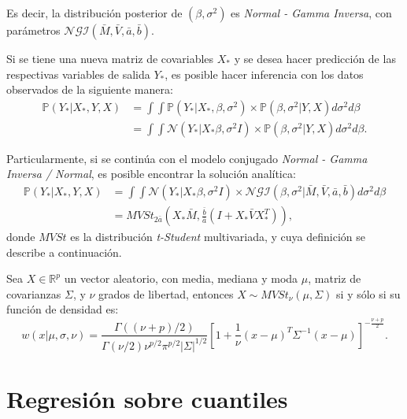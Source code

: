 Es decir, la distribuci\'on posterior de $(\beta,\sigma^2)$ es \textit{Normal - Gamma Inversa}, con par\'ametros $\mathcal{NGI}(\bar{M},\bar{V},\bar{a},\bar{b})$.

Si se tiene una nueva matriz de covariables $X_*$ y se desea hacer predicci\'on de las respectivas variables de salida $Y_*$, es posible hacer inferencia con los datos observados de la siguiente manera:
\begin{equation*}
\begin{aligned}
    \mathbb{P}(Y_*|X_*,Y,X)
    &= \int \int \mathbb{P}(Y_*|X_*,\beta,\sigma^2) \times \mathbb{P}(\beta,\sigma^2|Y,X) d\sigma^2 d\beta \\
    &= \int \int \mathcal{N}(Y_*|X_*\beta,\sigma^2I) \times \mathbb{P}(\beta,\sigma^2|Y,X) d\sigma^2 d\beta.
\end{aligned}
\end{equation*}

Particularmente, si se contin\'ua con el modelo conjugado \textit{Normal - Gamma Inversa / Normal}, es posible encontrar la soluci\'on anal\'itica:
\begin{equation*}
\begin{aligned}
    \mathbb{P}(Y_*|X_*,Y,X)
    &= \int \int \mathcal{N}(Y_*|X_*\beta,\sigma^2I) \times \mathcal{NGI}(\beta,\sigma^2|\bar{M},\bar{V},\bar{a},\bar{b}) d\sigma^2 d\beta \\
    &= MVSt_{2\bar{a}} 
       \left(
        X_*\bar{M},\frac{\bar{b}}{\bar{a}}\left(I + X_*\bar{V}X_*^T\right)
       \right),
\end{aligned}
\end{equation*}
donde $MVSt$ es la distribuci\'on \textit{t-Student} multivariada, y cuya definici\'on se describe a continuaci\'on. 

\begin{defin*}
    Sea $X \in \mathbb{R}^p$ un vector aleatorio, con media, mediana y moda $\mu$, matriz de covarianzas $\Sigma $, y $\nu$ grados de libertad, entonces $X \sim MVSt_{\nu}(\mu,\Sigma)$ si y s\'olo si su funci\'on de densidad es:
\begin{equation*}
    w(x|\mu,\sigma,\nu) = 
    \frac{\Gamma((\nu+p)/2)}{\Gamma(\nu/2)\nu^{p/2}\pi^{p/2}|\Sigma|^{1/2}}
    \left[1 + \frac{1}{\nu} (x-\mu)^T\Sigma^{-1}(x-\mu)\right]^{-\frac{\nu+p}{2}}.
\end{equation*}
\end{defin*}

\section{Regresión sobre cuantiles}

